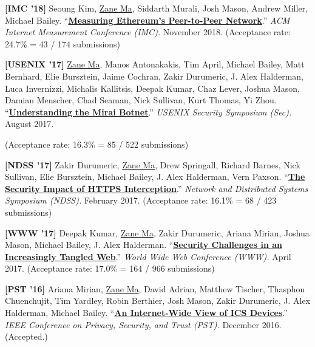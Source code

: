 \documentclass[10pt,singlecolumn]{article} %
\begin{document}
\begin{etaremune}

\item \textbf{[IMC '18]}
Seoung Kim, \underline{Zane Ma}, Siddarth Murali, Josh Mason, Andrew Miller, Michael Bailey.
``\textbf{\href{https://zanema.com/papers/imc18_ethpeers.pdf}{Measuring Ethereum's Peer-to-Peer Network}}.''
\emph{ACM Internet Measurement Conference (IMC).} November 2018.
(Acceptance rate: 24.7\% = 43 / 174 submissions)
\vspace{6pt}


\item \textbf{[USENIX '17]}
\underline{Zane Ma}, Manos Antonakakis, Tim April, Michael Bailey, Matt Bernhard, Elie Bursztein, Jaime Cochran, Zakir Durumeric, J. Alex Halderman, Luca Invernizzi, Michalis Kallitsis, Deepak Kumar, Chaz Lever, Joshua Mason, Damian Menscher, Chad Seaman, Nick Sullivan, Kurt Thomas, Yi Zhou.
``\textbf{\href{https://zanema.com/papers/usenix17_mirai.pdf}{Understanding the Mirai Botnet}}.''
\emph{USENIX Security Symposium (Sec).} August 2017.

(Acceptance rate: 16.3\% = 85 / 522 submissions)
\vspace{6pt}


\item \textbf{[NDSS '17]}
Zakir Durumeric, \underline{Zane Ma}, Drew Springall, Richard Barnes, Nick Sullivan, Elie Bursztein, Michael Bailey, J. Alex Halderman, Vern Paxson.
``\textbf{\href{https://zanema.com/papers/ndss17_interception.pdf}{The Security Impact of HTTPS Interception}}.''
\emph{Network and Distributed Systems Symposium (NDSS).} February 2017.
(Acceptance rate: 16.1\% = 68 / 423 submissions)
\vspace{6pt}


\item \textbf{[WWW '17]}
Deepak Kumar, \underline{Zane Ma}, Zakir Durumeric, Ariana Mirian, Joshua Mason, Michael Bailey, J. Alex Halderman.
``\textbf{\href{https://zanema.com/papers/www17_tangled.pdf}{Security Challenges in an Increasingly Tangled Web}}.''
\emph{World Wide Web Conference (WWW).} April 2017.
(Acceptance rate: 17.0\% = 164 / 966 submissions)
\vspace{6pt}


\item \textbf{[PST '16]}
Ariana Mirian, \underline{Zane Ma}, David Adrian, Matthew Tischer, Thasphon Chuenchujit, Tim Yardley, Robin Berthier, Josh Mason, Zakir Durumeric, J. Alex Halderman, Michael Bailey.
``\textbf{\href{https://zanema.com/papers/pst16_ics.pdf}{An Internet-Wide View of ICS Devices}}.''
\emph{IEEE Conference on Privacy, Security, and Trust (PST).} December 2016. (Accepted.)
\vspace{6pt}

\end{etaremune}
\end{document}
